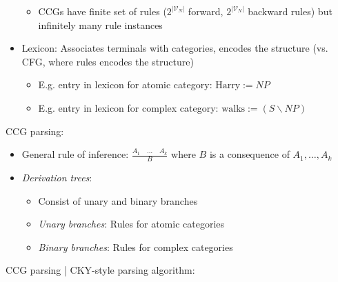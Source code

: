 \begin{itemize}
\begin{itemize}
        \item CCGs have finite set of rules ($2^{|\mathcal{V}_N|}$ forward, $2^{|\mathcal{V}_N|}$ backward rules) but infinitely many rule instances
    \end{itemize}
    \item Lexicon: Associates terminals with categories, encodes the structure (vs. CFG, where rules encodes the structure)
    \begin{itemize}
        \item E.g. entry in lexicon for atomic category: $\textrm{Harry} := NP$
        \item E.g. entry in lexicon for complex category: $\textrm{walks} := (S \backslash NP)$
    \end{itemize}
\end{itemize}
CCG parsing:
\begin{itemize}
    \item General rule of inference:
    $
    \frac{A_1 \quad \dots \quad A_k}{B}
    $
    where $B$ is a consequence of $A_1, \dots, A_k$
    \item \emph{Derivation trees}:
    \begin{itemize}
        \item Consist of unary and binary branches
        \item \emph{Unary branches}: Rules for atomic categories
        \item \emph{Binary branches}: Rules for complex categories
    \end{itemize}
\end{itemize}
CCG parsing | CKY-style parsing algorithm:
